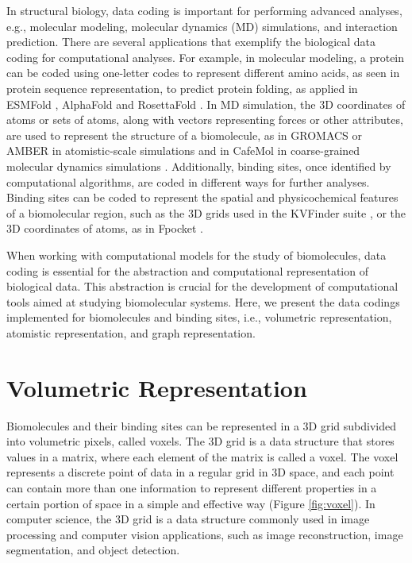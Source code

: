 \documentclass[Ingles]{phdthesis}
\def\ie{i.e.\onedot}
\def\eg{e.g.\onedot}
\begin{document}
In structural biology, data coding is important for performing advanced analyses, \eg, molecular modeling, molecular dynamics (MD) simulations, and interaction prediction. There are several applications that exemplify the biological data coding for computational analyses. For example, in molecular modeling, a protein can be coded using one-letter codes to represent different amino acids, as seen in protein sequence representation, to predict protein folding, as applied in ESMFold \cite{lin2022}, AlphaFold \cite{jumper2021} and RosettaFold \cite{baek2021}. In MD simulation, the 3D coordinates of atoms or sets of atoms, along with vectors representing forces or other attributes, are used to represent the structure of a biomolecule, as in GROMACS \cite{gromacs} or AMBER \cite{amber} in atomistic-scale simulations and in CafeMol in coarse-grained molecular dynamics simulations \cite{kenzaki2011}. Additionally, binding sites, once identified by computational algorithms, are coded in different ways for further analyses. Binding sites can be coded to represent the spatial and physicochemical features of a biomolecular region, such as the 3D grids used in the KVFinder suite \cite{guerra2019,guerra2020,guerra2021,guerra2023B}, or the 3D coordinates of atoms, as in Fpocket \cite{fpocket}.

When working with computational models for the study of biomolecules, data coding is essential for the abstraction and computational representation of biological data. This abstraction is crucial for the development of computational tools aimed at studying biomolecular systems. Here, we present the data codings implemented for biomolecules and binding sites, \ie, volumetric representation, atomistic representation, and graph representation.

\section{Volumetric Representation}

Biomolecules and their binding sites can be represented in a 3D grid subdivided into volumetric pixels, called voxels. The 3D grid is a data structure that stores values in a matrix, where each element of the matrix is called a voxel. The voxel represents a discrete point of data in a regular grid in 3D space, and each point can contain more than one information to represent different properties in a certain portion of space in a simple and effective way (Figure \ref{fig:voxel}). In computer science, the 3D grid is a data structure commonly used in image processing and computer vision applications, such as image reconstruction, image segmentation, and object detection. 
\end{document}
